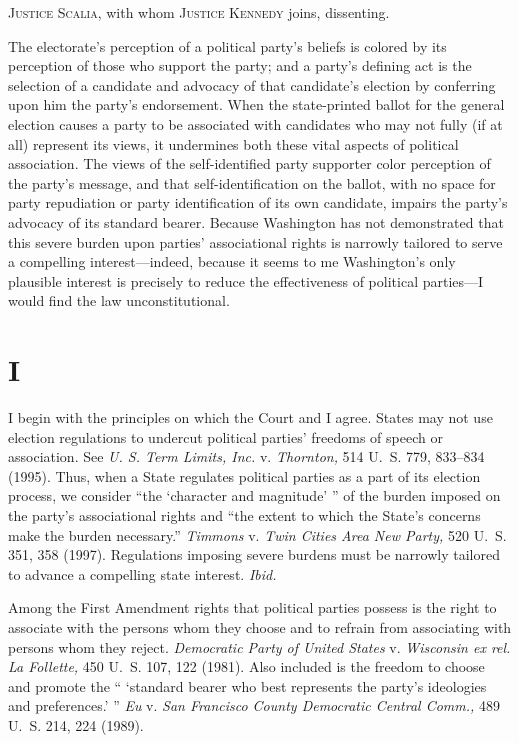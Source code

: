 
\setcounter{page}{462}

  \textsc{Justice Scalia,} with whom \textsc{Justice Kennedy} joins, dissenting.

  The electorate's perception of a political party's beliefs
is colored by its perception of those who support the party; and a
party's defining act is the selection of a candidate and advocacy
of that candidate's election by conferring upon him the party's
endorsement. When the state-printed ballot for the general election
causes a party to be associated with candidates who may not fully
(if at all) represent its views, it undermines both these vital
aspects of political association. The views of the self-identified
party supporter color perception of the party's message, and that
self-identification on the ballot, with no space for party repudiation
or party identification of its own candidate, impairs the party's
advocacy of its standard bearer. Because Washington has not demonstrated
that this severe burden upon parties' associational rights is
narrowly tailored to serve a compelling interest---indeed, because it
seems to me Washington's only plausible interest is precisely to
reduce the effectiveness of political parties---I would find the law
unconstitutional.

\section{I}

  I begin with the principles on which the Court and I agree. States may
not use election regulations to undercut political \newpage  parties'
freedoms of speech or association. See \emph{U. S. Term Limits, Inc.}
v. \emph{Thornton,} 514 U.~S. 779, 833--834 (1995). Thus, when a
State regulates political parties as a part of its election process,
we consider ``the ‘character and magnitude' '' of the burden
imposed on the party's associational rights and ``the extent to which
the State's concerns make the burden necessary.'' \emph{Timmons}
v. \emph{Twin Cities Area New Party,} 520 U.~S. 351, 358 (1997).
Regulations imposing severe burdens must be narrowly tailored to advance
a compelling state interest. \emph{Ibid.}

  Among the First Amendment rights that political parties possess is
the right to associate with the persons whom they choose and to refrain
from associating with persons whom they reject. \emph{Democratic Party of
United States} v. \emph{Wisconsin ex rel. La Follette,} 450 U.~S. 107,
122 (1981). Also included is the freedom to choose and promote the
`` ‘standard bearer who best represents the party's ideologies
and preferences.' '' \emph{Eu} v. \emph{San Francisco County Democratic
Central Comm.,} 489 U.~S. 214, 224 (1989).

